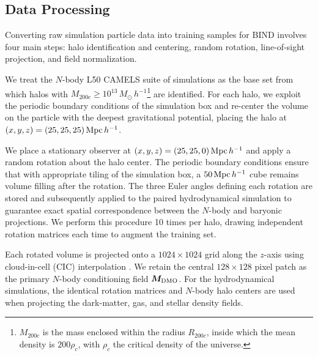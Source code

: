 \documentclass[linenumbers,trackchanges, twocolumn]{aastex701}
\begin{document}
\subsection{Data Processing}
\label{subsec:data_processing}

Converting raw simulation particle data into training samples for \textsc{BIND} involves four main steps: halo identification and centering, random rotation, line-of-sight projection, and field normalization.

We treat the $N$-body L50 CAMELS suite of simulations as the base set from which halos with $M_{200c} \geq 10^{13}\,M_{\odot}\,h^{-1}$\footnote{$M_{200c}$ is the mass enclosed within the radius $R_{200c}$, inside which the mean density is $200\rho_c$, with $\rho_c$ the critical density of the universe.} are identified. For each halo, we exploit the periodic boundary conditions of the simulation box and re-center the volume on the particle with the deepest gravitational potential, placing the halo at $(x,y,z) = (25,25,25)\,{\rm Mpc}\,h^{-1}$.

We place a stationary observer at $(x,y,z) = (25,25,0)\,{\rm Mpc}\,h^{-1}$ and apply a random rotation about the halo center. The periodic boundary conditions ensure that with appropriate tiling of the simulation box, a $50\,{\rm Mpc}\,h^{-1}$ cube remains volume filling after the rotation. The three Euler angles defining each rotation are stored and subsequently applied to the paired hydrodynamical simulation to guarantee exact spatial correspondence between the $N$-body and baryonic projections. We perform this procedure 10 times per halo, drawing independent rotation matrices each time to augment the training set.

Each rotated volume is projected onto a $1024\times1024$ grid along the $z$-axis using cloud-in-cell (CIC) interpolation \citep{hockney}. We retain the central $128\times128$ pixel patch as the primary $N$-body conditioning field $\bm{M}_{\rm DMO}$. For the hydrodynamical simulations, the identical rotation matrices and $N$-body halo centers are used when projecting the dark-matter, gas, and stellar density fields. 
\end{document}
